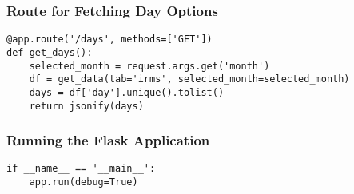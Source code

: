 \subsubsection{Route for Fetching Day Options}
\begin{lstlisting}[style=Python, caption=app.py - Fetch Days, frame=single]
@app.route('/days', methods=['GET'])
def get_days():
    selected_month = request.args.get('month')
    df = get_data(tab='irms', selected_month=selected_month)
    days = df['day'].unique().tolist()
    return jsonify(days)
\end{lstlisting}

\subsubsection{Running the Flask Application}
\begin{lstlisting}[style=Python, caption=app.py - Run Flask App, frame=single]
if __name__ == '__main__':
    app.run(debug=True)
\end{lstlisting}